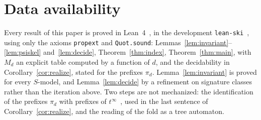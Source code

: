 \documentclass[11pt]{amsart}
\theoremstyle{definition}
\begin{document}
\section*{Data availability}
Every result of this paper is proved in
Lean~4~\citep{lean4}, in the development \texttt{lean-ski}~\citep{leanski}, using only the axioms \texttt{propext} and \texttt{Quot.sound}:
Lemmas~\ref{lem:invariant}--\ref{lem:psiskel} and~\ref{lem:decide}, Theorem~\ref{thm:index},
Theorem~\ref{thm:main}, with $M_d$ an explicit table computed by a function of $d$, and the decidability
in Corollary~\ref{cor:realize}, stated for the prefixes $\pi_d$. Lemma~\ref{lem:invariant} is proved for every $S$-model, and Lemma~\ref{lem:decide} by
a refinement on signature classes rather than the iteration above. Two steps are not mechanized: the
identification of the prefixes $\pi_d$ with prefixes of $t^\infty$~\citep{s3,s5}, used in the last
sentence of Corollary~\ref{cor:realize}, and the reading of the fold as a tree automaton.



\end{document}
